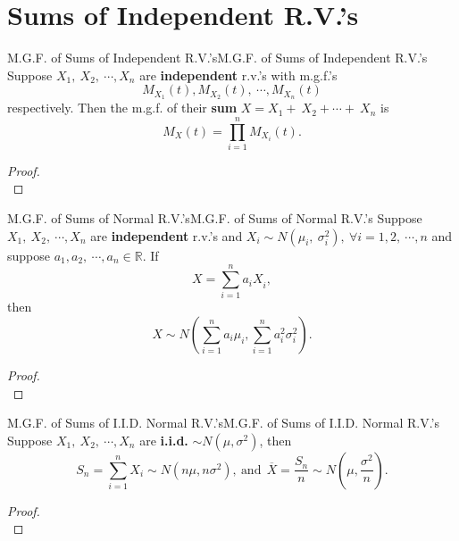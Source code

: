 \documentclass{elegantbook}
\begin{document}
\section{Sums of Independent R.V.'s}

\begin{theorem}{M.G.F. of Sums of Independent R.V.'s}{M.G.F. of Sums of Independent R.V.'s}
Suppose \(X_{1},\ X_{2},\ \cdots,X_{n}\) are \textbf{independent} r.v.'s
with m.g.f.'s
\[M_{X_{1}}(t),M_{X_{2}}(t),\ \cdots,M_{X_{n}}(t)\] respectively. Then the m.g.f. of their \textbf{sum}
\(X = X_{1} + \ X_{2} + \cdots + \ X_{n}\) is
\[M_{X}(t) = \prod_{i = 1}^{n}{M_{X_{i}}(t)}.\]
\end{theorem}

\begin{proof}
\\[4cm]\vspace{0.01cm}
\end{proof}

\begin{theorem}{M.G.F. of Sums of Normal R.V.'s}{M.G.F. of Sums of Normal R.V.'s}
Suppose \(X_{1},\ X_{2},\ \cdots,X_{n}\) are \textbf{independent} r.v.'s
and \(X_{i}\sim N\left( \mu_{i},\ \sigma_{i}^{2} \right),\ \forall i = 1,2,\ \cdots,n\)
and suppose \(a_{1},a_{2},\ \cdots,a_n\in\mathbb{R}\).
If 
\[ X = \sum_{i = 1}^{n}{a_{i}X}_{i},\]
then
\[ X\sim N\left( \sum_{i = 1}^{n}{a_{i}\mu_{i}},\sum_{i = 1}^{n}{a_{i}^{2}\sigma_{i}^{2}} \right).\]
\end{theorem}

\begin{proof}
\\[4cm]\vspace{0.01cm}
\end{proof}

\begin{corollary}{M.G.F. of Sums of I.I.D. Normal R.V.'s}{M.G.F. of Sums of I.I.D. Normal R.V.'s}
Suppose \(X_{1},\ X_{2},\ \cdots,X_{n}\) are \textbf{i.i.d.} 
\(\sim N\left( \mu,\sigma^{2} \right)\), then
\[S_{n} = \sum_{i = 1}^{n}X_{i}\sim N\left( n\mu,n\sigma^{2} \right),\ \mathrm{\text{and}}\mathrm{\ }\ \overline{X} = \frac{S_{n}}{n}\sim N\left( \mu,\frac{\sigma^{2}}{n} \right).\]
\end{corollary}

\begin{proof}
\\[4cm]\vspace{0.01cm}
\end{proof}
\end{document}
